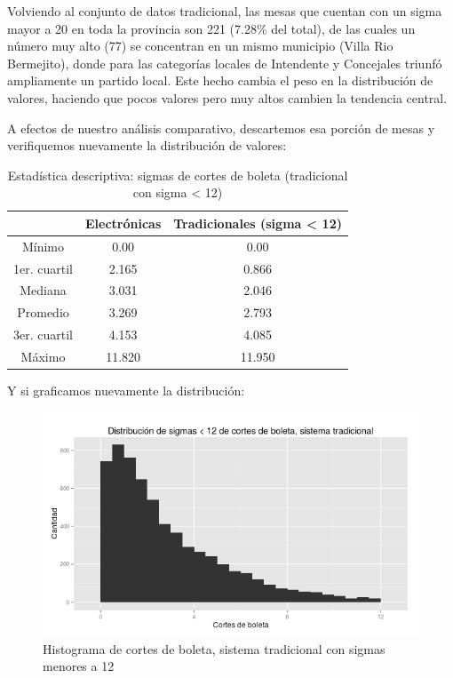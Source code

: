 \documentclass[12pt,a4paper]{article}
\begin{document}
Volviendo al conjunto de datos tradicional, las mesas que cuentan con
un sigma mayor a 20 en toda la provincia son 221 (7.28\% del total), de las
cuales un número muy alto (77) se concentran en un mismo municipio (Villa Rio
Bermejito), donde para las categorías locales de Intendente y Concejales triunfó
ampliamente un partido local. Este hecho cambia el peso en la distribución de
valores, haciendo que pocos valores pero muy altos cambien la tendencia central.

A efectos de nuestro análisis comparativo, descartemos esa porción de mesas y
verifiquemos nuevamente la distribución de valores:

\begin{table}[h!]
\centering
\label{my-label}
\begin{tabular}{c c c}
 & Electrónicas & Tradicionales (sigma < 12) \\
\hline
Mínimo & 0.00 & 0.00 \\
1er. cuartil & 2.165 & 0.866 \\
Mediana & 3.031 & 2.046 \\
Promedio & 3.269 & 2.793 \\
3er. cuartil & 4.153 & 4.085 \\
Máximo & 11.820 & 11.950 \\
\hline
\end{tabular}
\caption{Estadística descriptiva: sigmas de cortes de boleta (tradicional con
  sigma < 12)}
\label{table:1}
\end{table}

Y si graficamos nuevamente la distribución:

\begin{figure}[h]
\centering
    \includegraphics[width=\textwidth]{sigmas_tradicional_menor_a_12}
\caption{Histograma de cortes de boleta, sistema tradicional con sigmas menores
  a 12}
\end{figure}
\end{document}
